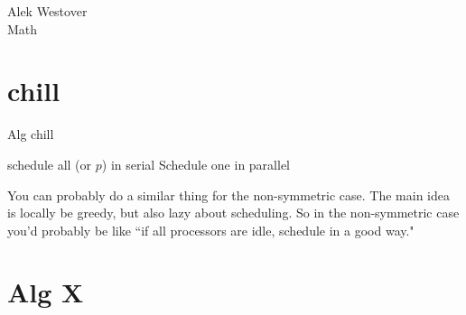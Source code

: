 \documentclass{article}[11pt]
\begin{document}
\begin{center}
\begin{Large}
	Alek Westover \\
	\vspace{2mm}
	Math 
\end{Large}
\end{center}
\thispagestyle{empty}

\section{chill}
\begin{algorithm}
  \caption{Alg chill}
  \begin{algorithmic}[1]
          \State schedule all (or $p$) in serial
        \Else
          \State Schedule one in parallel
        \EndIf
      \EndIf
    \EndWhile
    \EndProcedure
  \end{algorithmic}
\end{algorithm}

You can probably do a similar thing for the non-symmetric case.
The main idea is locally be greedy, but also lazy about
scheduling.
So in the non-symmetric case you'd probably be like ``if all
processors are idle, schedule in a good way."


\section{Alg X}
\end{document}
